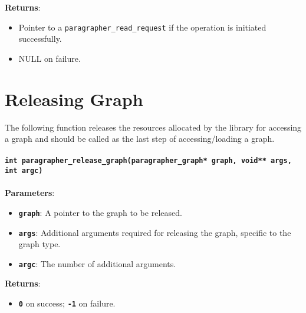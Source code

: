 \documentclass[a4paper]{article}
\begin{document}
\textbf{Returns}:
\begin{itemize}
    \setlength{\itemsep}{0pt}
    \setlength{\parskip}{0pt}
    \setlength{\parsep}{0pt}

    \item Pointer to a \texttt{paragrapher\_read\_request} if the operation is initiated successfully.
    \item NULL on failure.
\end{itemize}

\section{Releasing Graph}
The following function releases the resources allocated by the library for accessing a graph and
should be called as the last step of accessing/loading a graph.
\\
\\
\textbf{\texttt{int paragrapher\_release\_graph(paragrapher\_graph* graph, void** args, int argc)}}
\\
\\
\textbf{Parameters}:
\begin{itemize}
    \setlength{\itemsep}{0pt}
    \setlength{\parskip}{0pt}
    \setlength{\parsep}{0pt}

    \item \textbf{\texttt{graph}}: A pointer to the graph to be released.
    \item \textbf{\texttt{args}}: Additional arguments required for releasing the graph, specific to the graph type.
    \item \textbf{\texttt{argc}}: The number of additional arguments.
\end{itemize}
\textbf{Returns}:
\begin{itemize}
    \item \textbf{\texttt{0}} on success; \textbf{\texttt{-1}} on failure.
\end{itemize}
\end{document}
